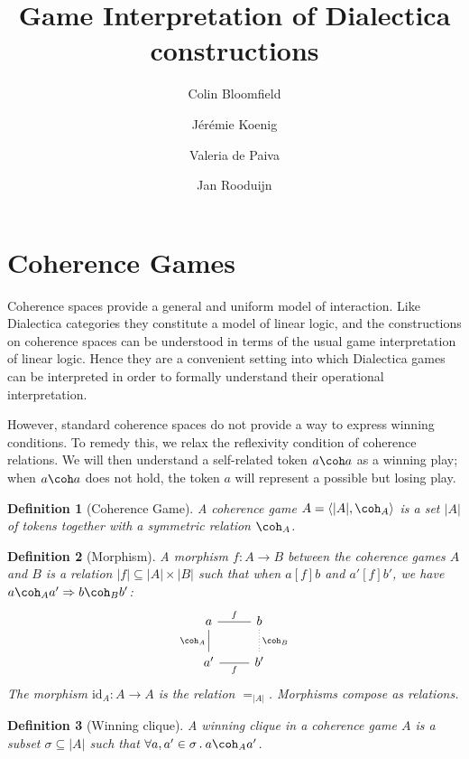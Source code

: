\documentclass{article}
\title{Game Interpretation of Dialectica constructions}
\author{
  Colin Bloomfield \and
  J\'er\'emie Koenig \and
  Valeria de Paiva \and
  Jan Rooduijn}
\newtheorem{definition}{Definition}
\begin{document}
\maketitle

\section{Coherence Games}

Coherence spaces provide a general and uniform model of interaction.
Like Dialectica categories they constitute a model of linear logic,
and the constructions on coherence spaces
can be understood in terms of the usual game interpretation of linear logic.
Hence they are a convenient setting into which
Dialectica games can be interpreted
in order to formally understand their operational interpretation.

However,
standard coherence spaces do not provide a way to
express winning conditions.
To remedy this, we relax the reflexivity condition
of coherence relations.
We will then understand a self-related token $a \coh a$
as a winning play;
when $a \coh a$ does not hold,
the token $a$ will represent a possible but losing play.

\begin{definition}[Coherence Game]
A coherence game $A = \langle |A|, {\coh_A} \rangle$
is a set $|A|$ of \emph{tokens}
together with a symmetric relation $\coh_A$.
\end{definition}

\begin{definition}[Morphism]
A morphism $f : A \rightarrow B$
between the coherence games $A$ and $B$
is a relation $|f| \subseteq |A| \times |B|$
such that
when $a \mathrel{[f]} b$ and $a' \mathrel{[f]} b'$,
we have $a \coh_A a' \Rightarrow b \coh_B b'$:
\[
  \begin{tikzcd}
    a \ar[r, dash, "f"] \ar[d, dash, "\coh_A"'] &
    b \ar[d, dash, dotted, "\coh_B"] \\
    a' \ar[r, dash, "f"'] & b'
  \end{tikzcd}
\]
The morphism $\mathrm{id}_A : A \rightarrow A$
is the relation $=_{|A|}$.
Morphisms compose as relations.
\end{definition}

\begin{definition}[Winning clique]
A winning clique in a coherence game $A$
is a subset $\sigma \subseteq |A|$
such that
$\forall a, a' \in \sigma \mathbin{.} a \coh_A a'$.
\end{definition}
\end{document}
